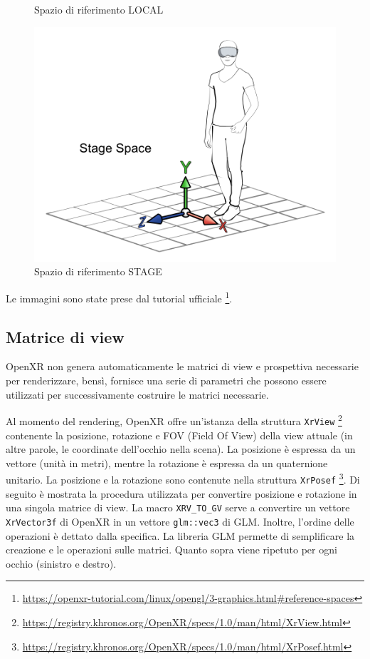 \documentclass[twoside]{supsistudent}
\begin{document}
\begin{figure}[H]
\begin{minipage}{.3\textwidth}
    \caption{Spazio di riferimento LOCAL}
  \end{minipage}
  \begin{minipage}{.3\textwidth}
    \centering
    \includegraphics[width=.9\linewidth]{resources/stage_space.png}
    \caption{Spazio di riferimento STAGE}
  \end{minipage}
\end{figure}

Le immagini sono state prese dal tutorial ufficiale \footnote{\url{https://openxr-tutorial.com/linux/opengl/3-graphics.html\#reference-spaces}}.

\subsection{Matrice di view}

OpenXR non genera automaticamente le matrici di view e prospettiva necessarie per renderizzare, bensì, fornisce una serie di parametri che possono essere utilizzati per successivamente costruire le matrici necessarie.

Al momento del rendering, OpenXR offre un'istanza della struttura \texttt{XrView} \footnote{\url{https://registry.khronos.org/OpenXR/specs/1.0/man/html/XrView.html}} contenente la posizione, rotazione e FOV (Field Of View) della view attuale (in altre parole, le coordinate dell'occhio nella scena). La posizione è espressa da un vettore (unità in metri), mentre la rotazione è espressa da un quaternione unitario. La posizione e la rotazione sono contenute nella struttura \texttt{XrPosef} \footnote{\url{https://registry.khronos.org/OpenXR/specs/1.0/man/html/XrPosef.html}}. Di seguito è mostrata la procedura utilizzata per convertire posizione e rotazione in una singola matrice di view. La macro \texttt{XRV\_TO\_GV} serve a convertire un vettore \texttt{XrVector3f} di OpenXR in un vettore \texttt{glm::vec3} di GLM. Inoltre, l'ordine delle operazioni è dettato dalla specifica. La libreria GLM permette di semplificare la creazione e le operazioni sulle matrici. Quanto sopra viene ripetuto per ogni occhio (sinistro e destro).
\end{document}

